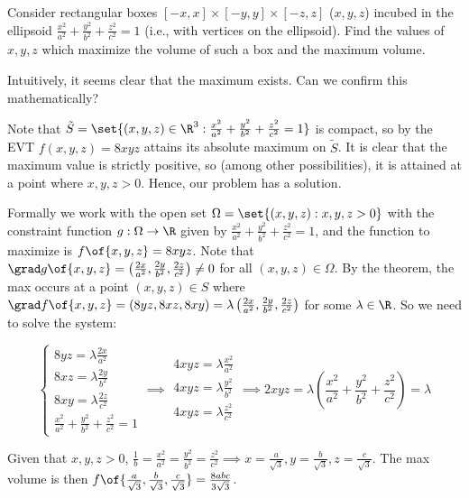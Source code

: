 \begin{example}
    Consider rectangular boxes $[-x,x] \times [-y,y] \times [-z,z]$ ($x,y,z$) incubed in the ellipsoid $\frac{x^2}{a^2} + \frac{y^2}{b^2} + \frac{z^2}{c^2} = 1$ (i.e., with vertices on the ellipsoid). Find the values of $x,y,z$ which maximize the volume of such a box and the maximum volume.

    Intuitively, it seems clear that the maximum exists. Can we confirm this mathematically?

    Note that $\tilde{S} = \set{(x,y,z) \in \R^3: \frac{x^2}{a^2} + \frac{y^2}{b^2} + \frac{z^2}{c^2} = 1}$ is compact, so by the EVT $f(x,y,z) = 8xyz$ attains its absolute maximum on $\tilde{S}$. It is clear that the maximum value is strictly positive, so (among other possibilities), it is attained at a point where $x,y,z > 0$. Hence, our problem has a solution.
    
    Formally we work with the open set $\Omega = \set{(x,y,z): x,y,z > 0}$ with the constraint function $g: \Omega \to \R$ given by $\frac{x^2}{a^2} + \frac{y^2}{b^2} + \frac{z^2}{c^2} = 1$, and the function to maximize is $f\of{x,y,z} = 8xyz$. Note that $\grad g\of{x,y,z} = \left(\frac{2x}{a^2},\frac{2y}{b^2},\frac{2z}{c^2}\right) \neq 0$ for all $(x,y,z) \in \Omega$. By the theorem, the max occurs at a point $(x,y,z) \in S$ where $\grad f\of{x,y,z} = (8yz, 8xz, 8xy) = \lambda \left(\frac{2x}{a^2},\frac{2y}{b^2},\frac{2z}{c^2}\right)$ for some $\lambda \in \R$. So we need to solve the system:

    \[\left\{\begin{matrix}
        8yz = \lambda \frac{2x}{a^2} \\
        8xz = \lambda \frac{2y}{b^2} \\
        8xy = \lambda \frac{2z}{c^2} \\
        \frac{x^2}{a^2} + \frac{y^2}{b^2} + \frac{z^2}{c^2} = 1
    \end{matrix}\right. \implies \begin{matrix}
        4xyz = \lambda \frac{x^2}{a^2} \\
        4xyz = \lambda \frac{y^2}{b^2} \\
        4xyz = \lambda \frac{z^2}{c^2} \\
    \end{matrix} \implies 2xyz = \lambda \left(\frac{x^2}{a^2} + \frac{y^2}{b^2} + \frac{z^2}{c^2}\right) = \lambda\]

    Given that $x,y,z > 0$, $\frac{1}{b} = \frac{x^2}{a^2} = \frac{y^2}{b^2} = \frac{z^2}{c^2} \implies x = \frac{a}{\sqrt{3}}, y = \frac{b}{\sqrt{3}}, z = \frac{c}{\sqrt{3}}$. The max volume is then $f\of{\frac{a}{\sqrt{3}},\frac{b}{\sqrt{3}},\frac{c}{\sqrt{3}}} = \frac{8abc}{3\sqrt{3}}$.
\end{example}
